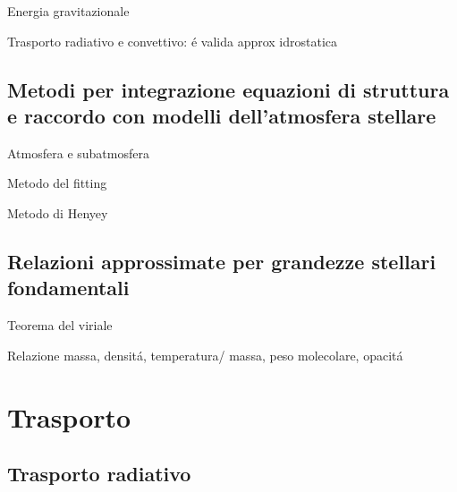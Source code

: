 \begin{frame}{Energia gravitazionale}

\end{frame}

\begin{frame}{Trasporto radiativo e convettivo: \'e valida approx idrostatica}

\end{frame}

\subsection{Metodi per integrazione equazioni di struttura e raccordo con modelli dell'atmosfera stellare}

\begin{frame}{Atmosfera e subatmosfera}

\end{frame}

\begin{frame}{Metodo del fitting}

\end{frame}

\begin{frame}{Metodo di Henyey}

\end{frame}

\subsection{Relazioni approssimate per grandezze stellari fondamentali}

\begin{frame}{Teorema del viriale}

\end{frame}

\begin{frame}{Relazione massa, densit\'a, temperatura/ massa, peso molecolare, opacit\'a}

\end{frame}

\section{Trasporto}

\subsection{Trasporto radiativo}

